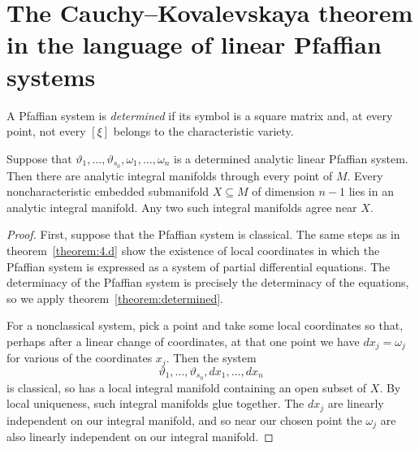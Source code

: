 \section{The Cauchy--Kovalevskaya theorem in the language of linear Pfaffian systems}
A Pfaffian system is \emph{determined} if its symbol is a square matrix and, at every point, not every \([\xi]\) belongs to the characteristic variety.
\begin{theorem}
Suppose that \(\vartheta_1,\dots,\vartheta_{s_0},\omega_1,\dots,\omega_n\) is a determined analytic linear Pfaffian system.
Then there are analytic integral manifolds through every point of \(M\).
Every noncharacteristic embedded submanifold \(X \subseteq M\) of dimension \(n-1\) lies in an analytic integral manifold.
Any two such integral manifolds agree near \(X\).
\end{theorem}
\begin{proof}
First, suppose that the Pfaffian system is classical.
The same steps as in theorem~\vref{theorem:4.d} show the existence of local coordinates in which the Pfaffian system is expressed as a system of partial differential equations.
The determinacy of the Pfaffian system is precisely the determinacy of the equations, so we apply theorem~\vref{theorem:determined}.

For a nonclassical system, pick a point and take some local coordinates so that, perhaps after a linear change of coordinates, at that one point we have \(dx_j=\omega_j\) for various of the coordinates \(x_j\).
Then the system 
\[
\vartheta_1,\dots,\vartheta_{s_0},dx_1,\dots,dx_n
\]
is classical, so has a local integral manifold containing an open subset of \(X\).
By local uniqueness, such integral manifolds glue together.
The \(dx_j\) are linearly independent on our integral manifold, and so near our chosen point the \(\omega_j\) are also linearly independent on our integral manifold.
\end{proof}






